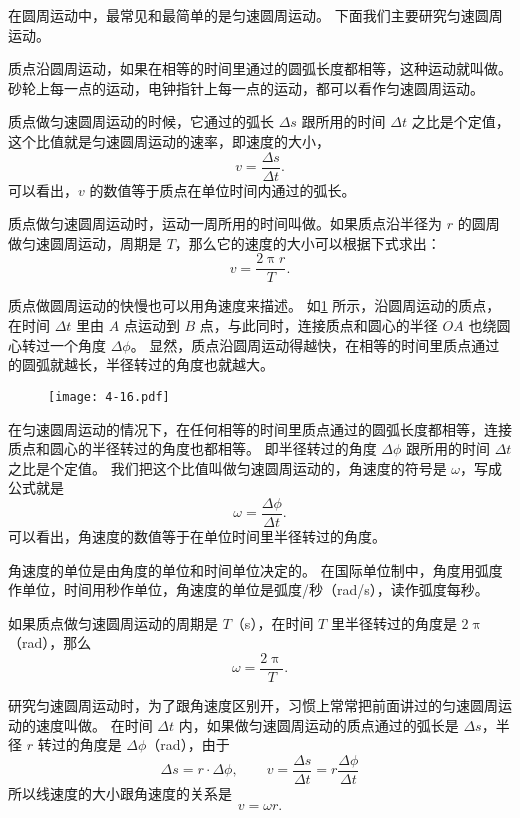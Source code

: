 在圆周运动中，最常见和最简单的是匀速圆周运动。
下面我们主要研究匀速圆周运动。

质点沿圆周运动，如果在相等的时间里通过的圆弧长度都相等，这种运动就叫做。
砂轮上每一点的运动，电钟指针上每一点的运动，都可以看作匀速圆周运动。

质点做匀速圆周运动的时候，它通过的弧长 $\Delta s$ 跟所用的时间 $\Delta t$ 之比是个定值，这个比值就是匀速圆周运动的速率，即速度的大小，
\[v=\frac{\Delta s}{\Delta t}.\]
可以看出，$v$ 的数值等于质点在单位时间内通过的弧长。

质点做匀速圆周运动时，运动一周所用的时间叫做。如果质点沿半径为 $r$ 的圆周做匀速圆周运动，周期是 $T$，那么它的速度的大小可以根据下式求出：
\begin{equation}
  \label{eq:v_vs_T}
v=\frac{2\uppi r}{T}.
\end{equation}

质点做圆周运动的快慢也可以用角速度来描述。
如\cref{fig:4-16} 所示，沿圆周运动的质点，在时间 $\Delta t$ 里由 $A$ 点运动到 $B$ 点，与此同时，连接质点和圆心的半径 $OA$ 也绕圆心转过一个角度 $\Delta \phi$。
显然，质点沿圆周运动得越快，在相等的时间里质点通过的圆弧就越长，半径转过的角度也就越大。

\begin{figure}
  \texttt{[image: 4-16.pdf]}
  \caption{}\label{fig:4-16}
\end{figure}

在匀速圆周运动的情况下，在任何相等的时间里质点通过的圆弧长度都相等，连接质点和圆心的半径转过的角度也都相等。
即半径转过的角度 $\Delta \phi$ 跟所用的时间 $\Delta t$ 之比是个定值。
我们把这个比值叫做匀速圆周运动的，角速度的符号是 $\omega$，写成公式就是
\[\omega=\frac{\Delta \phi}{\Delta t}.\]
可以看出，角速度的数值等于在单位时间里半径转过的角度。

角速度的单位是由角度的单位和时间单位决定的。
在国际单位制中，角度用弧度作单位，时间用秒作单位，角速度的单位是弧度/秒（\unit{rad/s}），读作弧度每秒。

如果质点做匀速圆周运动的周期是 $T$（\unit{s}），在时间 $T$ 里半径转过的角度是 $2\uppi$（\unit{rad}），那么
\begin{equation}
  \label{eq:omega_vs_T}
\omega=\frac{2\uppi}{T}.
\end{equation}

研究匀速圆周运动时，为了跟角速度区别开，习惯上常常把前面讲过的匀速圆周运动的速度叫做。
在时间 $\Delta t$ 内，如果做匀速圆周运动的质点通过的弧长是 $\Delta s$，半径 $r$ 转过的角度是 $\Delta \phi$（\unit{rad}），由于
\[\Delta s=r\cdot \Delta \phi, \qquad v=\frac{\Delta s}{\Delta t}=r\frac{\Delta \phi}{\Delta t} \]
所以线速度的大小跟角速度的关系是
\begin{equation}
  \label{eq:v_vs_omega}
v=\omega r.
\end{equation}

